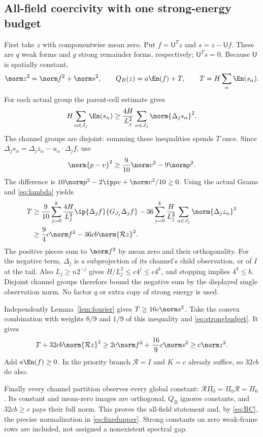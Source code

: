\subsection{All-field coercivity with one strong-energy budget}
First take $z$ with componentwise mean zero. Put $f=\mathsf U^Tz$ and
$s=z-\mathsf U f$. These are $q$ weak forms and $g$ strong remainder forms,
respectively; $\mathsf U^Ts=0$. Because $\mathsf U$ is spatially constant,
\begin{equation}\label{eq:split}
 \norm z^2=\norm f^2+\norm s^2,\qquad
 Q_B(z)=a\En(f)+T,\qquad T=H\sum_\alpha\En(s_\alpha).
\end{equation}
For each actual group the parent-cell estimate gives
\[
 H\sum_{\alpha\in J_j}\En(s_\alpha)
 \geq\frac{4H}{L_j^2}\sum_{\alpha\in J_j}\norm{\Delta_js_\alpha}^2.
\]
The channel groups are disjoint: summing these inequalities spends $T$ once.
Since $\Delta_js_\alpha=\Delta_jz_\alpha-u_\alpha\cdot\Delta_j f$, use
\[
 \norm{p-v}^2\geq\frac9{10}\norm v^2-9\norm p^2.
\]
The difference is $10\norm p^2-2\ip p v+\norm v^2/10\geq0$.
Using the actual Grams and \eqref{eq:lambda} yields
\begin{align}\label{eq:strongbudget}
 T&\geq\frac9{10}\sum_{j=0}^k\frac{4H}{L_j^2}
       \ip{\Delta_j f}{G_{J_j}\Delta_j f}
       -36\sum_{j=0}^k\frac H{L_j^2}
                     \sum_{\alpha\in J_j}\norm{\Delta_jz_\alpha}^2\nonumber\\
 &\geq\frac94c\norm f^2-36cb\norm{\mathcal Rz}^2.
\end{align}
The positive pieces sum to $\norm f^2$ by mean zero and their orthogonality.
For the negative term, $\Delta_j$ is a subprojection of its channel's child
observation, or of $I$ at the tail. Also $L_j\geq n2^{-j}$ gives
$H/L_j^2\leq c4^j\leq c4^k$, and stopping implies $4^k\leq b$.
Disjoint channel groups therefore bound the negative sum by the displayed
single observation norm. No factor $q$ or extra copy of strong energy is used.

Independently Lemma~\ref{lem:fourier} gives $T\geq16c\norm s^2$.
Take the convex combination with weights $8/9$ and $1/9$ of this inequality
and \eqref{eq:strongbudget}. It gives
\[
 T+32cb\norm{\mathcal Rz}^2
 \geq2c\norm f^2+\frac{16}{9}c\norm s^2\geq c\norm z^2.
\]
Add $a\En(f)\geq0$. In the priority branch $\mathcal R=I$ and $K=c$
already suffice, so $32cb$ do also.

Finally every channel partition observes every global constant:
$\mathcal R\Pi_0=\Pi_0\mathcal R=\Pi_0$. Its constant and mean-zero images
are orthogonal, $Q_B$ ignores constants, and $32cb\geq c$ pays their full
norm. This proves the all-field statement and, by \eqref{eq:RC}, the precise
normalization in \eqref{eq:fixedupper}. Strong constants on zero weak-frame
rows are included, not assigned a nonexistent spectral gap.

